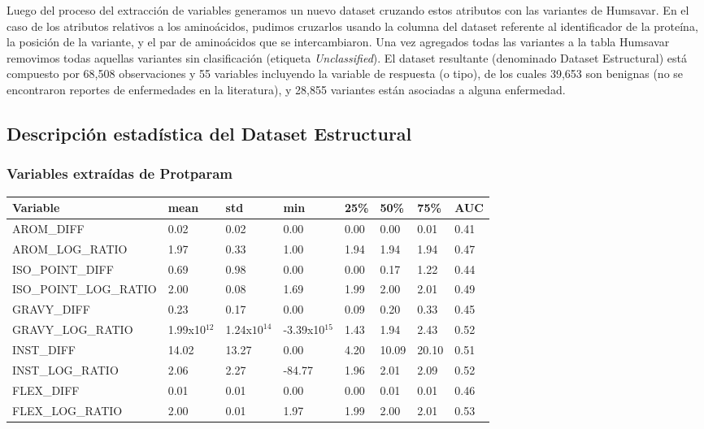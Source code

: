 Luego del proceso del extracción de variables generamos un nuevo dataset cruzando estos atributos con las variantes de Humsavar. En el caso de los atributos relativos a los aminoácidos, pudimos cruzarlos usando la columna del dataset referente al identificador de la proteína, la posición de la variante, y el par de aminoácidos que se intercambiaron. Una vez agregados todas las variantes a la tabla Humsavar removimos todas aquellas variantes sin clasificación (etiqueta \textit{Unclassified}). El dataset resultante (denominado Dataset Estructural) está compuesto por 68,508 observaciones y 55 variables incluyendo la variable de respuesta (o tipo), de los cuales 39,653 son benignas (no se encontraron reportes de enfermedades en la literatura), y 28,855 variantes están asociadas a alguna enfermedad. 

\subsection{Descripción estadística del Dataset Estructural}

\subsubsection{Variables extraídas de Protparam}

\begin{table}[H]
\begin{tabular}{|l|l|l|l|l|l|l|l|}
\hline
Variable & mean & std & min & 25\% & 50\%  & 75\%  & AUC \\ \hline
AROM\_DIFF  & 0.02  & 0.02  & 0.00 & 0.00 & 0.00  & 0.01  & 0.41 \\ \hline
AROM\_LOG\_RATIO & 1.97 & 0.33 & 1.00 & 1.94 & 1.94  & 1.94  & 0.47 \\ \hline
ISO\_POINT\_DIFF & 0.69  & 0.98 & 0.00  & 0.00 & 0.17  & 1.22  & 0.44 \\ \hline
ISO\_POINT\_LOG\_RATIO & 2.00 & 0.08 & 1.69 & 1.99 & 2.00  & 2.01  & 0.49 \\ \hline
GRAVY\_DIFF & 0.23 & 0.17 & 0.00 & 0.09 & 0.20  & 0.33  & 0.45 \\ \hline
GRAVY\_LOG\_RATIO & 1.99x10$^{12}$ & 1.24x$10^{14}$ & -3.39x10$^{15}$ & 1.43 & 1.94 & 2.43 & 0.52 \\\hline
INST\_DIFF & 14.02 & 13.27 & 0.00 & 4.20 & 10.09 & 20.10 & 0.51 \\ \hline
INST\_LOG\_RATIO & 2.06 & 2.27 & -84.77 & 1.96 & 2.01  & 2.09  & 0.52 \\ \hline
FLEX\_DIFF & 0.01 & 0.01 & 0.00 & 0.00 & 0.01  & 0.01  & 0.46 \\ \hline
FLEX\_LOG\_RATIO & 2.00 & 0.01 & 1.97 & 1.99 & 2.00  & 2.01  & 0.53 \\ \hline
\end{tabular}
\end{table}

